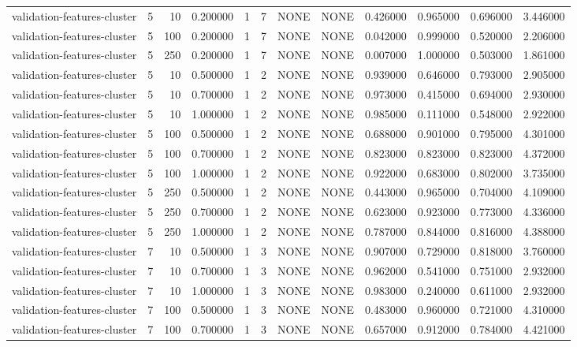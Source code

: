 \begin{tabular}{lrrrllllrrrr}
validation-features-cluster & 5 & 10 & 0.200000 & 1 & 7 & NONE & NONE & 0.426000 & 0.965000 & 0.696000 & 3.446000 \\
validation-features-cluster & 5 & 100 & 0.200000 & 1 & 7 & NONE & NONE & 0.042000 & 0.999000 & 0.520000 & 2.206000 \\
validation-features-cluster & 5 & 250 & 0.200000 & 1 & 7 & NONE & NONE & 0.007000 & 1.000000 & 0.503000 & 1.861000 \\
validation-features-cluster & 5 & 10 & 0.500000 & 1 & 2 & NONE & NONE & 0.939000 & 0.646000 & 0.793000 & 2.905000 \\
validation-features-cluster & 5 & 10 & 0.700000 & 1 & 2 & NONE & NONE & 0.973000 & 0.415000 & 0.694000 & 2.930000 \\
validation-features-cluster & 5 & 10 & 1.000000 & 1 & 2 & NONE & NONE & 0.985000 & 0.111000 & 0.548000 & 2.922000 \\
validation-features-cluster & 5 & 100 & 0.500000 & 1 & 2 & NONE & NONE & 0.688000 & 0.901000 & 0.795000 & 4.301000 \\
validation-features-cluster & 5 & 100 & 0.700000 & 1 & 2 & NONE & NONE & 0.823000 & 0.823000 & 0.823000 & 4.372000 \\
validation-features-cluster & 5 & 100 & 1.000000 & 1 & 2 & NONE & NONE & 0.922000 & 0.683000 & 0.802000 & 3.735000 \\
validation-features-cluster & 5 & 250 & 0.500000 & 1 & 2 & NONE & NONE & 0.443000 & 0.965000 & 0.704000 & 4.109000 \\
validation-features-cluster & 5 & 250 & 0.700000 & 1 & 2 & NONE & NONE & 0.623000 & 0.923000 & 0.773000 & 4.336000 \\
validation-features-cluster & 5 & 250 & 1.000000 & 1 & 2 & NONE & NONE & 0.787000 & 0.844000 & 0.816000 & 4.388000 \\
validation-features-cluster & 7 & 10 & 0.500000 & 1 & 3 & NONE & NONE & 0.907000 & 0.729000 & 0.818000 & 3.760000 \\
validation-features-cluster & 7 & 10 & 0.700000 & 1 & 3 & NONE & NONE & 0.962000 & 0.541000 & 0.751000 & 2.932000 \\
validation-features-cluster & 7 & 10 & 1.000000 & 1 & 3 & NONE & NONE & 0.983000 & 0.240000 & 0.611000 & 2.932000 \\
validation-features-cluster & 7 & 100 & 0.500000 & 1 & 3 & NONE & NONE & 0.483000 & 0.960000 & 0.721000 & 4.310000 \\
validation-features-cluster & 7 & 100 & 0.700000 & 1 & 3 & NONE & NONE & 0.657000 & 0.912000 & 0.784000 & 4.421000 \\

\end{tabular}
